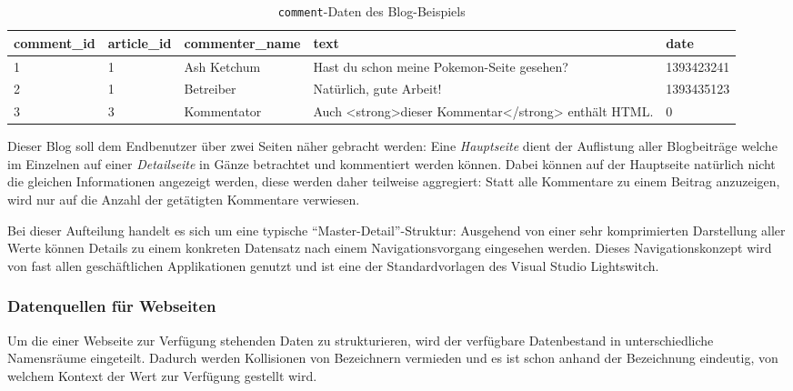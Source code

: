 \begin{table}[h]
  \centering
  \begin{tabularx}{\linewidth}{ l l l X l }
    comment\_id&article\_id&commenter\_name&text&date\\
    \hline
    1&1&Ash Ketchum&Hast du schon meine Pokemon-Seite gesehen?&1393423241\\
    2&1&Betreiber&Natürlich, gute Arbeit!&1393435123\\
    3&3&Kommentator&Auch <strong>dieser Kommentar</strong> enthält HTML.&0\\
  \end{tabularx}
  \caption{\texttt{comment}-Daten des Blog-Beispiels}
  \label{tab:ui-concept-data-comment}
\end{table}

Dieser Blog soll dem Endbenutzer über zwei Seiten näher gebracht werden: Eine \textit{Hauptseite} dient der Auflistung aller Blogbeiträge welche im Einzelnen auf einer \textit{Detailseite} in Gänze betrachtet und kommentiert werden können. Dabei können auf der Hauptseite natürlich nicht die gleichen Informationen angezeigt werden, diese werden daher teilweise aggregiert: Statt alle Kommentare zu einem Beitrag anzuzeigen, wird nur auf die Anzahl der getätigten Kommentare verwiesen.

Bei dieser Aufteilung handelt es sich um eine typische "`Master-Detail"'-Struktur: Ausgehend von einer sehr komprimierten Darstellung aller Werte können Details zu einem konkreten Datensatz nach einem Navigationsvorgang eingesehen werden. Dieses Navigationskonzept wird von fast allen geschäftlichen Applikationen genutzt und ist eine der Standardvorlagen des Visual Studio Lightswitch.

\subsubsection{Datenquellen für Webseiten}

Um die einer Webseite zur Verfügung stehenden Daten zu strukturieren, wird der verfügbare Datenbestand in unterschiedliche Namensräume eingeteilt. Dadurch werden Kollisionen von Bezeichnern vermieden und es ist schon anhand der Bezeichnung eindeutig, von welchem Kontext der Wert zur Verfügung gestellt wird.

